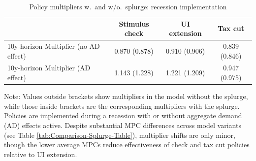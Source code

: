 \documentclass[\latexroot/\projectname]{subfiles}
\begin{document}
\begin{table}[tb] 
  \caption{\pregenmark Policy multipliers w.\ and w/o.\ splurge: recession implementation}
  \whenintegrated{\label{tab:Multiplier-SplurgeComp}} %
  \centering

  \begin{tabular*}
    {\textwidth}{@{\extracolsep{\fill}}lccc@{}}
    \hline
    & Stimulus check & UI extension & Tax cut \\ \hline
    10y-horizon Multiplier (no AD effect) & 0.870 (0.878) & 0.910 (0.906) & 0.839 (0.846) \\
    10y-horizon Multiplier (AD effect)    & 1.143 (1.228) & 1.221 (1.209) & 0.947 (0.975) \\
    \hline
  \end{tabular*}

  \noindent\parbox{\textwidth}{
    \medskip
    \footnotesize Note: Values outside brackets show multipliers in the model without the splurge, while those inside brackets are the corresponding multipliers with the splurge. Policies are implemented during a recession with or without aggregate demand (AD) effects active. Despite substantial MPC differences across model variants (see Table \ref{tab:Comparison-Splurge-Table}), multiplier shifts are only minor, though the lower average MPCs reduce effectiveness of check and tax cut policies relative to UI extension.
  }
\end{table}

\vspace{0.5em}

\smartbib
\end{document}
